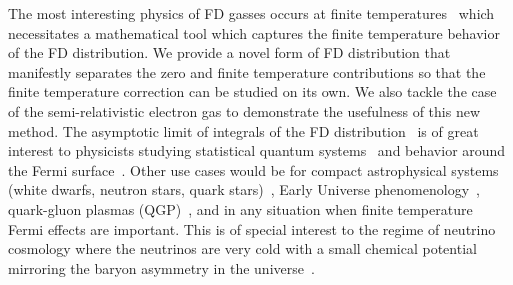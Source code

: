 \documentclass[sn-mathphys,Numbered]{sn-jnl}
\newcommand{\rsec}[1]{Sec.~{\ref{#1}}}
\begin{document}
The most interesting physics of FD gasses occurs at finite temperatures~\cite{bludman1977equation,Elze:1980er} which necessitates a mathematical tool which captures the finite temperature behavior of the FD distribution. We provide a novel form of FD distribution that manifestly separates the zero and finite temperature contributions so that the finite temperature correction can be studied on its own. We also tackle the case of the semi-relativistic electron gas to demonstrate the usefulness of this new method. The asymptotic limit of integrals of the FD distribution~\cite{dingle1957fermi,dingle1973asymptotic} is of great interest to physicists studying statistical quantum systems~\cite{10.1063/1.1350634,10.1142/S021827180701002X,10.1063/1.1665160,FUKUSHIMA2014417,GIL2022126618,GIL2023108563} and behavior around the Fermi surface~\cite{kim2008notes,PhysRevB.103.205154}. Other use cases would be for compact astrophysical systems (white dwarfs, neutron stars, quark stars)~\cite{Kaspi:2017fwg,Ferrer:2019xlr,Ferrer:2023pgq}, Early Universe phenomenology~\cite{Rafelski:2021aey,Rafelski:2023emw,Grayson:2023flr,Steinmetz:2023nsc}, quark-gluon plasmas (QGP)~\cite{Letessier:2002ony,Rafelski:2020ajx,Yang:2021bko}, and in any situation when finite temperature Fermi effects are important. This is of special interest to the regime of neutrino cosmology where the neutrinos are very cold with a small chemical potential mirroring the baryon asymmetry in the universe~\cite{Birrell:2013gpa,Birrell:2012gg}.

\end{document}
